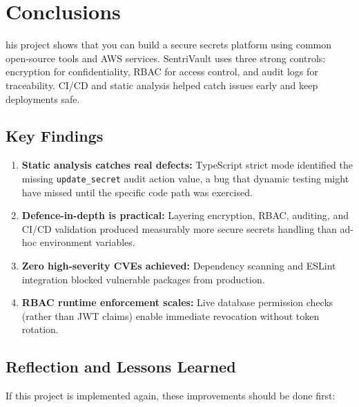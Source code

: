 \documentclass[conference]{IEEEtran}
\begin{document}
\section{Conclusions}
\label{sec:conclusions}

\lettrine[findent=2pt]{}{ }his project shows that you can build a secure secrets platform using common open-source tools and AWS services. SentriVault uses three strong controls: encryption for confidentiality, RBAC for access control, and audit logs for traceability. CI/CD and static analysis helped catch issues early and keep deployments safe.

\subsection{Key Findings}

\begin{enumerate}
  \item \textbf{Static analysis catches real defects:} TypeScript strict mode identified the missing \texttt{update\_secret} audit action value, a bug that dynamic testing might have missed until the specific code path was exercised.
  \item \textbf{Defence-in-depth is practical:} Layering encryption, RBAC, auditing, and CI/CD validation produced measurably more secure secrets handling than ad-hoc environment variables.
  \item \textbf{Zero high-severity CVEs achieved:} Dependency scanning and ESLint integration blocked vulnerable packages from production.
  \item \textbf{RBAC runtime enforcement scales:} Live database permission checks (rather than JWT claims) enable immediate revocation without token rotation.
\end{enumerate}

\subsection{Reflection and Lessons Learned}

If this project is implemented again, these improvements should be done first:
\end{document}
